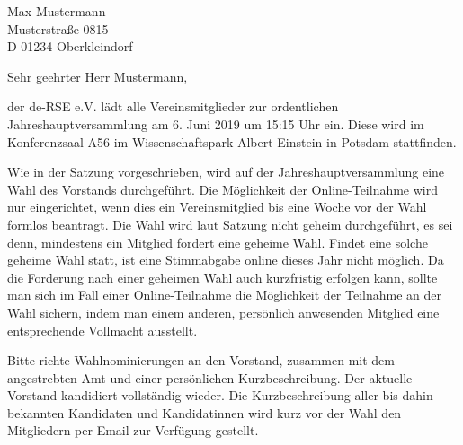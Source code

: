 \documentclass[../Vorlagen/de-RSE_Brief,a4paper]{scrlttr2}
\begin{document}

\begin{letter}{
    Max Mustermann\\
    Musterstraße 0815\\
    D-01234 Oberkleindorf
}
\opening{Sehr geehrter Herr Mustermann,}

der de-RSE e.V. lädt alle Vereinsmitglieder zur ordentlichen Jahreshauptversammlung am 6. Juni 2019 um 15:15 Uhr ein.
Diese wird im Konferenzsaal A56 im Wissenschaftspark Albert Einstein in Potsdam stattfinden.

Wie in der Satzung vorgeschrieben, wird auf der Jahreshauptversammlung eine Wahl des Vorstands durchgeführt.
Die Möglichkeit der Online-Teilnahme wird nur eingerichtet, wenn dies ein Vereinsmitglied bis eine Woche vor der Wahl formlos beantragt.
Die Wahl wird laut Satzung nicht geheim durchgeführt, es sei denn, mindestens ein Mitglied fordert eine geheime Wahl.
Findet eine solche geheime Wahl statt, ist eine Stimmabgabe online dieses Jahr nicht möglich.
Da die Forderung nach einer geheimen Wahl auch kurzfristig erfolgen kann, sollte man sich im Fall einer Online-Teilnahme die Möglichkeit der Teilnahme an der Wahl sichern, indem man einem anderen, persönlich anwesenden Mitglied eine entsprechende Vollmacht ausstellt.

Bitte richte Wahlnominierungen an den Vorstand, zusammen mit dem angestrebten Amt und einer persönlichen Kurzbeschreibung.
Der aktuelle Vorstand kandidiert vollständig wieder.
Die Kurzbeschreibung aller bis dahin bekannten Kandidaten und Kandidatinnen wird kurz vor der Wahl den Mitgliedern per Email zur Verfügung gestellt.


\end{letter}
\end{document}
